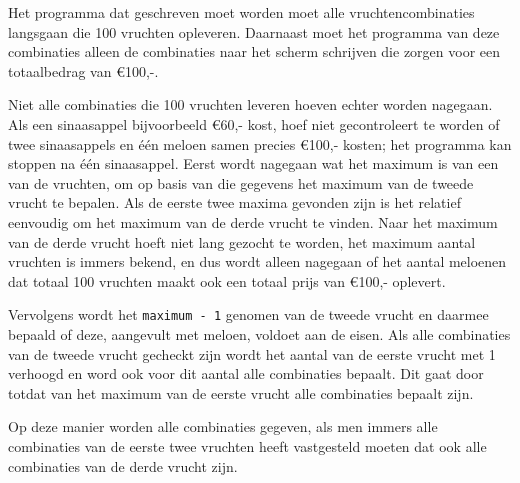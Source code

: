 Het programma dat geschreven moet worden moet alle vruchtencombinaties langsgaan die 100 vruchten opleveren. Daarnaast moet het programma van deze combinaties alleen de combinaties naar het scherm schrijven die zorgen voor een totaalbedrag van \euro 100,-.

Niet alle combinaties die 100 vruchten leveren hoeven echter worden nagegaan. Als een sinaasappel bijvoorbeeld \euro60,- kost, hoef niet gecontroleert te worden of twee sinaasappels en \'e\'en meloen samen precies \euro 100,- kosten; het programma kan stoppen na \'e\'en sinaasappel. 
Eerst wordt nagegaan wat het maximum is van een van de vruchten, om op basis van die gegevens het maximum van de tweede vrucht te bepalen.
Als de eerste twee maxima gevonden zijn is het relatief eenvoudig om het maximum van de derde vrucht te vinden.
Naar het maximum van de derde vrucht hoeft niet lang gezocht te worden, het maximum aantal vruchten is immers bekend, en dus wordt alleen nagegaan of het aantal meloenen dat totaal 100 vruchten maakt ook een totaal prijs van \euro 100,- oplevert.

Vervolgens wordt het {\tt maximum - 1} genomen van de tweede vrucht en daarmee bepaald of deze, aangevult met meloen, voldoet aan de eisen.
Als alle combinaties van de tweede vrucht gecheckt zijn wordt het aantal van de eerste vrucht met 1 verhoogd en word ook voor dit aantal alle combinaties bepaalt.
Dit gaat door totdat van het maximum van de eerste vrucht alle combinaties bepaalt zijn.

Op deze manier worden alle combinaties gegeven, als men immers alle combinaties van de eerste twee vruchten heeft vastgesteld moeten dat ook alle combinaties van de derde vrucht zijn.